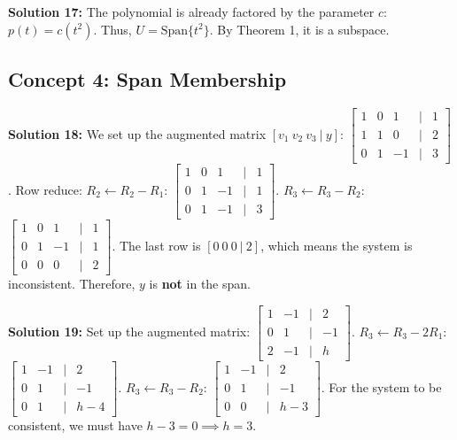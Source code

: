 \documentclass[11pt]{article}
\begin{document}
\vspace{0.3cm}
\textbf{Solution 17:}
The polynomial is already factored by the parameter $c$:
$p(t) = c(t^2)$.
Thus, $U = \text{Span}\{ t^2 \}$. By Theorem 1, it is a subspace.

\subsection*{Concept 4: Span Membership}

\textbf{Solution 18:}
We set up the augmented matrix $[v_1 \ v_2 \ v_3 \ | \ y]$:
$\begin{bmatrix} 1 & 0 & 1 & | & 1 \\ 1 & 1 & 0 & | & 2 \\ 0 & 1 & -1 & | & 3 \end{bmatrix}$.
Row reduce: $R_2 \leftarrow R_2 - R_1$:
$\begin{bmatrix} 1 & 0 & 1 & | & 1 \\ 0 & 1 & -1 & | & 1 \\ 0 & 1 & -1 & | & 3 \end{bmatrix}$.
$R_3 \leftarrow R_3 - R_2$:
$\begin{bmatrix} 1 & 0 & 1 & | & 1 \\ 0 & 1 & -1 & | & 1 \\ 0 & 0 & 0 & | & 2 \end{bmatrix}$.
The last row is $[0 \ 0 \ 0 \ | \ 2]$, which means the system is inconsistent. Therefore, $y$ is \textbf{not} in the span.

\vspace{0.3cm}
\textbf{Solution 19:}
Set up the augmented matrix:
$\begin{bmatrix} 1 & -1 & | & 2 \\ 0 & 1 & | & -1 \\ 2 & -1 & | & h \end{bmatrix}$.
$R_3 \leftarrow R_3 - 2R_1$:
$\begin{bmatrix} 1 & -1 & | & 2 \\ 0 & 1 & | & -1 \\ 0 & 1 & | & h-4 \end{bmatrix}$.
$R_3 \leftarrow R_3 - R_2$:
$\begin{bmatrix} 1 & -1 & | & 2 \\ 0 & 1 & | & -1 \\ 0 & 0 & | & h-3 \end{bmatrix}$.
For the system to be consistent, we must have $h-3 = 0 \implies h = 3$.
\end{document}
